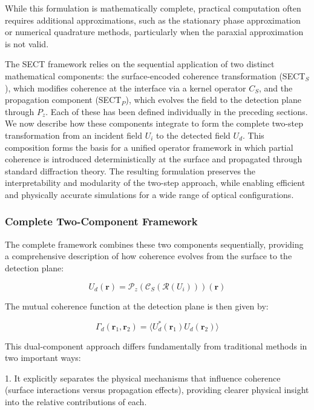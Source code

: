 \documentclass[a4paper,12pt]{article}
\begin{document}
While this formulation is mathematically complete, practical computation often requires additional approximations, such 
as the stationary phase approximation or numerical quadrature methods, particularly when the paraxial approximation is 
not valid.

The SECT framework relies on the sequential application of two distinct mathematical components: the surface-encoded 
coherence transformation (SECT$_S$), which modifies coherence at the interface via a kernel operator \( C_S \), and the 
propagation component (SECT$_P$), which evolves the field to the detection plane through \( P_z \). 
Each of these has been defined individually in the preceding sections. We now describe how these components 
integrate to form the complete two-step transformation from an incident field \( U_i \) to the detected field \( U_d \). 
This composition forms the basis for a unified operator framework in which partial coherence is introduced 
deterministically at the surface and propagated through standard diffraction theory. The resulting formulation 
preserves the interpretability and modularity of the two-step approach, while enabling efficient and physically accurate 
simulations for a wide range of optical configurations.

\subsubsection{Complete Two-Component Framework}

The complete framework combines these two components sequentially, providing a comprehensive description of how coherence evolves from the surface to the detection plane:

\begin{equation}
U_d(\bm{r}) = \mathcal{P}_z(\mathcal{C}_S(\mathcal{R}(U_i)))(\bm{r})
\end{equation}

The mutual coherence function at the detection plane is then given by:

\begin{equation}
\Gamma_d(\bm{r}_1, \bm{r}_2) = \langle U_d^*(\bm{r}_1) U_d(\bm{r}_2) \rangle
\end{equation}

This dual-component approach differs fundamentally from traditional methods in two important ways:

1. It explicitly separates the physical mechanisms that influence coherence (surface interactions versus propagation effects), providing clearer physical insight into the relative contributions of each.
\end{document}
